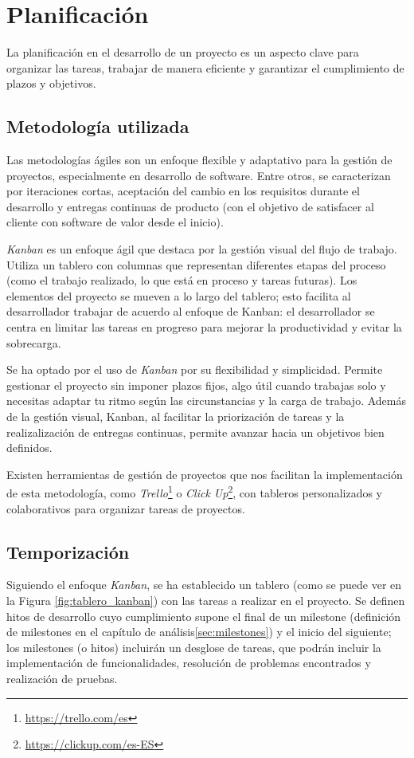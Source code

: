 \chapter{Planificación}

La planificación en el desarrollo de un proyecto es un aspecto clave para organizar las tareas, trabajar de manera eficiente y garantizar el cumplimiento de plazos y objetivos.

\section{Metodología utilizada}
Las metodologías ágiles son un enfoque flexible y adaptativo para la gestión de proyectos, especialmente en desarrollo de software. Entre otros, se caracterizan por iteraciones cortas, aceptación del cambio en los requisitos durante el desarrollo y entregas continuas de producto (con el objetivo de satisfacer al cliente con software de valor desde el inicio)\cite{agileprinciples}.

\textit{Kanban} es un enfoque ágil que destaca por la gestión visual del flujo de trabajo. Utiliza un tablero con columnas que representan diferentes etapas del proceso (como el trabajo realizado, lo que está en proceso y tareas futuras). Los elementos del proyecto se mueven a lo largo del tablero; esto facilita al desarrollador trabajar de acuerdo al enfoque de Kanban: el desarrollador se centra en limitar las tareas en progreso para mejorar la productividad y evitar la sobrecarga\cite{majkamastering}.

Se ha optado por el uso de \textit{Kanban} por su flexibilidad y simplicidad. Permite gestionar el proyecto sin imponer plazos fijos, algo útil cuando trabajas solo y necesitas adaptar tu ritmo según las circunstancias y la carga de trabajo. Además de la gestión visual, Kanban, al facilitar la priorización de tareas y la realizalización de entregas continuas, permite avanzar hacia un objetivos bien definidos.

Existen herramientas de gestión de proyectos que nos facilitan la implementación de esta metodología, como \textit{Trello}\footnote{\url{https://trello.com/es}} o \textit{Click Up}\footnote{\url{https://clickup.com/es-ES}}, con tableros personalizados y colaborativos para organizar tareas de proyectos.


\section{Temporización}
Siguiendo el enfoque \textit{Kanban}, se ha establecido un tablero (como se puede ver en la Figura \ref{fig:tablero_kanban}) con las tareas a realizar en el proyecto. Se definen hitos de desarrollo cuyo cumplimiento supone el final de un milestone (definición de milestones en el capítulo de análisis\ref{sec:milestones}) y el inicio del siguiente; los milestones (o hitos) incluirán un desglose de tareas, que podrán incluir la implementación de funcionalidades, resolución de problemas encontrados y realización de pruebas. 

